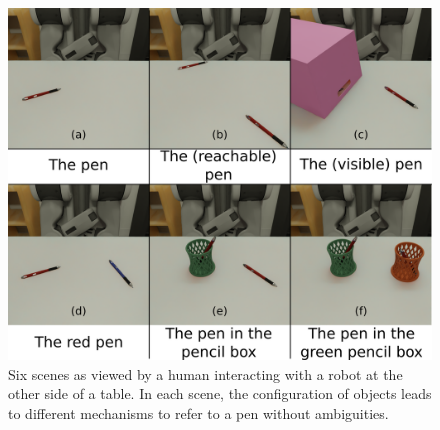 \documentclass[a4paper,11pt,twoside]{StyleThese}
\begin{document}
\begin{figure}[hbtp]
\centering
\includegraphics[width=\textwidth]{figures/chapter3/pens.png}
\caption{Six scenes as viewed by a human interacting with a robot at the other side of a table. In each scene, the configuration of objects leads to different mechanisms to refer to a pen without ambiguities.}
\label{fig:pens}
\end{figure}
\end{document}
